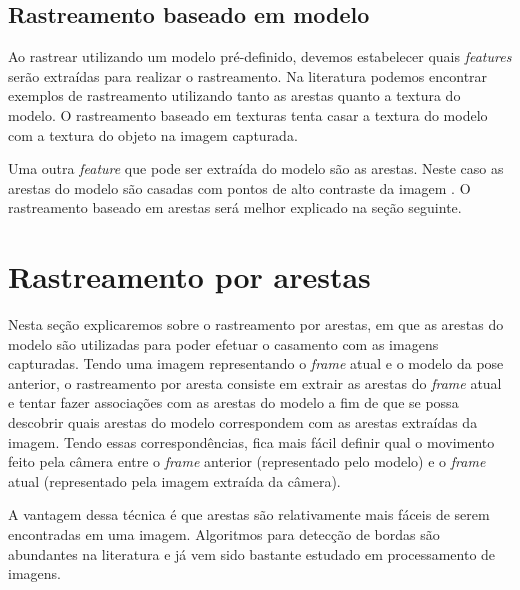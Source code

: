 \subsection{Rastreamento baseado em modelo}

Ao rastrear utilizando um modelo pré-definido, devemos estabelecer quais \emph{features} serão extraídas para realizar o rastreamento. Na literatura podemos encontrar exemplos de rastreamento utilizando tanto as arestas quanto a textura do modelo. O rastreamento baseado em texturas tenta casar a textura do modelo com a textura do objeto na imagem capturada.%


Uma outra \emph{feature} que pode ser extraída do modelo são as arestas. Neste caso as arestas do modelo são casadas com pontos de alto contraste da imagem \cite{drummondecipolla}. O rastreamento baseado em arestas será melhor explicado na seção seguinte.


\section{Rastreamento por arestas}

Nesta seção explicaremos sobre o rastreamento por arestas, em que as arestas do modelo são utilizadas para poder efetuar o casamento com as imagens capturadas. Tendo uma imagem representando o \emph{frame} atual e o modelo da pose anterior, o rastreamento por aresta consiste em extrair as arestas do \emph{frame} atual e tentar fazer associações com as arestas do modelo a fim de que se possa descobrir quais arestas do modelo correspondem com as arestas extraídas da imagem. Tendo essas correspondências, fica mais fácil definir qual o movimento feito pela câmera entre o \emph{frame} anterior (representado pelo modelo) e o \emph{frame} atual (representado pela imagem extraída da câmera).

A vantagem dessa técnica é que arestas são relativamente mais fáceis de serem encontradas em uma imagem. Algoritmos para detecção de bordas são abundantes na literatura e já vem sido bastante estudado em processamento de imagens.%

